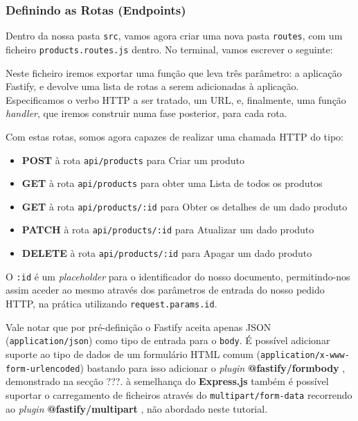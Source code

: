 \subsubsection{Definindo as Rotas (Endpoints)}

Dentro da nossa pasta \texttt{src}, vamos agora criar uma nova pasta \texttt{routes}, com um ficheiro \texttt{products.routes.js} dentro. No terminal, vamos escrever o seguinte:



Neste ficheiro iremos exportar uma função que leva três parâmetro: a aplicação Fastify, e devolve uma lista de rotas a serem adicionadas à aplicação. Especificamos o verbo HTTP a ser tratado, um URL, e, finalmente, uma função \textit{handler}, que iremos construir numa fase posterior, para cada rota.



Com estas rotas, somos agora capazes de realizar uma chamada HTTP do tipo:

\begin{itemize}
    \item \textbf{POST} à rota \texttt{api/products} para Criar um produto
    \item \textbf{GET} à rota \texttt{api/products} para obter uma Lista de todos os produtos
    \item \textbf{GET} à rota \texttt{api/products/:id} para Obter os detalhes de um dado produto
    \item \textbf{PATCH} à rota \texttt{api/products/:id} para Atualizar um dado produto
    \item \textbf{DELETE} à rota \texttt{api/products/:id} para Apagar um dado produto
\end{itemize}

O \texttt{:id} é um \textit{placeholder} para o identificador do nosso documento, permitindo-nos assim aceder ao mesmo através dos parâmetros de entrada do nosso pedido HTTP, na prática utilizando \texttt{request.params.id}.

Vale notar que por pré-definição o Fastify aceita apenas JSON (\texttt{application/json}) como tipo de entrada para o \texttt{body}. É possível adicionar suporte ao tipo de dados de um formulário HTML comum (\texttt{application/x-www-form-urlencoded}) bastando para isso adicionar o \textit{plugin} \textbf{@fastify/formbody} \cite{noauthor_fastifyformbody_nodate}, demonstrado na secção ???. à semelhança do \textbf{Express.js} também é possível suportar o carregamento de ficheiros através do \texttt{multipart/form-data} recorrendo ao \textit{plugin} \textbf{@fastify/multipart} \cite{noauthor_fastifymultipart_nodate}, não abordado neste tutorial.

